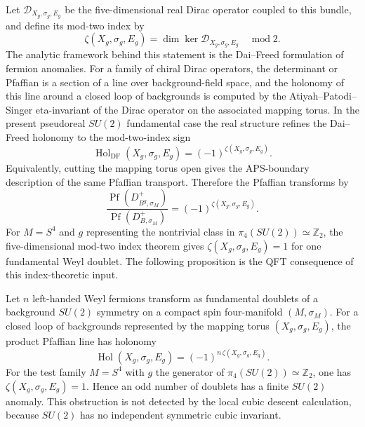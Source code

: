 Let \(\mathcal D_{X_g,\sigma_g,E_g}\) be the five-dimensional real Dirac
operator coupled to this bundle, and define its mod-two index by
\[
  \zeta(X_g,\sigma_g,E_g)
  =
  \dim\ker\mathcal D_{X_g,\sigma_g,E_g}
  \quad \operatorname{mod}2 .
\]
The analytic framework behind this statement is the Dai--Freed formulation of
fermion anomalies.  For a family of chiral Dirac operators, the determinant or
Pfaffian is a section of a line over background-field space, and the holonomy
of this line around a closed loop of backgrounds is computed by the
Atiyah--Patodi--Singer eta-invariant of the Dirac operator on the associated
mapping torus.  In the present pseudoreal \(SU(2)\) fundamental case the real
structure refines the Dai--Freed holonomy to the mod-two-index sign
\begin{equation}
  \operatorname{Hol}_{\mathrm{DF}}(X_g,\sigma_g,E_g)
  =
  (-1)^{\zeta(X_g,\sigma_g,E_g)} .
  \label{eq:su2-dai-freed-holonomy}
\end{equation}
Equivalently, cutting the mapping torus open gives the APS-boundary
description of the same Pfaffian transport.  Therefore the Pfaffian transforms
by
\begin{equation}
  \frac{\operatorname{Pf}(D_{B^g,\sigma_M}^+)}
       {\operatorname{Pf}(D_{B,\sigma_M}^+)}
  =
  (-1)^{\zeta(X_g,\sigma_g,E_g)} .
  \label{eq:su2-global-anomaly-pfaffian}
\end{equation}
For \(M=S^4\) and \(g\) representing the nontrivial class in
\(\pi_4(SU(2))\simeq\mathbb Z_2\), the five-dimensional mod-two index theorem
gives \(\zeta(X_g,\sigma_g,E_g)=1\) for one fundamental Weyl doublet.  The
following proposition is the QFT consequence of this index-theoretic input.

\begin{proposition}
\label{prop:finite-su2-anomaly-doublets}
Let \(n\) left-handed Weyl fermions transform as fundamental doublets of a
background \(SU(2)\) symmetry on a compact spin four-manifold
\((M,\sigma_M)\).  For a closed loop of backgrounds represented by the mapping
torus \((X_g,\sigma_g,E_g)\), the product Pfaffian line has holonomy
\[
  \operatorname{Hol}(X_g,\sigma_g,E_g)
  =
  (-1)^{n\,\zeta(X_g,\sigma_g,E_g)} .
\]
For the test family \(M=S^4\) with \(g\) the generator of
\(\pi_4(SU(2))\simeq\mathbb Z_2\), one has
\(\zeta(X_g,\sigma_g,E_g)=1\).  Hence an odd number of doublets has a finite
\(SU(2)\) anomaly.  This obstruction is not detected by the local cubic
descent calculation, because \(SU(2)\) has no independent symmetric cubic
invariant.
\end{proposition}

